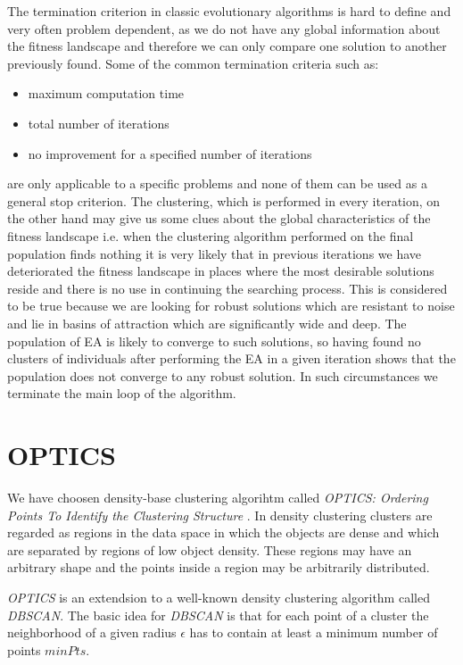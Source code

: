 The termination criterion in classic evolutionary algorithms is hard to define
and very often problem dependent, as we do not have any global information about 
the fitness landscape and therefore we can only compare one solution to another
previously found. 
Some of the common termination criteria such as: 
\begin{itemize}
  \item maximum computation time
  \item total number of iterations
  \item no improvement for a specified number of iterations
\end{itemize}
are only applicable to a specific problems and none of them can be used
as a general stop criterion. 
The clustering, which is performed in every iteration, 
on the other hand may give us some clues about the global
characteristics of the fitness landscape i.e. when the clustering algorithm performed 
on the final population finds nothing it is very likely that in previous
iterations we have deteriorated the fitness landscape in places where 
the most desirable solutions reside and there is no use in continuing the
searching process. This is considered to be true because we are looking for
robust solutions which are resistant to noise and lie in basins of attraction 
which are significantly wide and deep. The population of EA is likely 
to converge to such solutions, so having found no clusters of individuals after
performing the EA in a given iteration shows that the population does not converge 
to any robust solution. In such circumstances we terminate the main loop
of the algorithm.

\section{OPTICS}

We have choosen density-base clustering algorihtm called \textit{OPTICS:
Ordering Points To Identify the Clustering Structure} \cite{optics}. In density
clustering clusters are regarded as regions in the data space in which the objects are 
dense and which are separated by regions of low object density. These regions
may have an arbitrary shape and the points inside a region may be arbitrarily
distributed.

\textit{OPTICS} is an extendsion to a well-known density clustering algorithm
called \textit{DBSCAN}. The basic idea for \textit{DBSCAN} is that for each
point of a cluster the neighborhood of a given radius $\epsilon$ has to contain
at least a minimum number of points $minPts$.

